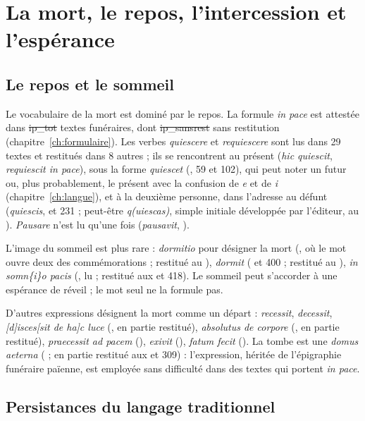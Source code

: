\chapter{La mort, le repos, l’intercession et l’espérance}\label{ch:mort_esperance}

\section{Le repos et le sommeil}

Le vocabulaire de la mort est dominé par le repos. La formule \emph{in pace} est attestée dans \st{ip_tot} textes funéraires, dont \st{ip_sansrest} sans restitution (chapitre~\ref{ch:formulaire}). Les verbes \emph{quiescere} et \emph{requiescere} sont lus dans 29 textes et restitués dans 8 autres ; ils se rencontrent au présent (\emph{hic quiescit}, \emph{requiescit in pace}), sous la forme \emph{quiescet} (, 59 et 102), qui peut noter un futur ou, plus probablement, le présent avec la confusion de \emph{e} et de \emph{i} (chapitre~\ref{ch:langue}), et à la deuxième personne, dans l’adresse au défunt (\emph{quiescis},  et 231 ; peut-être \emph{q(uiescas)}, simple initiale développée par l’éditeur, au ). \emph{Pausare} n’est lu qu’une fois (\emph{pausavit}, ).

L’image du sommeil est plus rare : \emph{dormitio} pour désigner la mort (, où le mot ouvre deux des commémorations ; restitué au ), \emph{dormit} ( et 400 ; restitué au ), \emph{in somn\{i\}o pacis} (, lu ; restitué aux  et 418). Le sommeil peut s’accorder à une espérance de réveil ; le mot seul ne la formule pas.

D’autres expressions désignent la mort comme un départ : \emph{recessit}, \emph{decessit}, \emph{[d]isces[sit de ha]c luce} (, en partie restitué), \emph{absolutus de corpore} (, en partie restitué), \emph{praecessit ad pacem} (), \emph{exivit} (), \emph{fatum fecit} (). La tombe est une \emph{domus aeterna} ( ; en partie restitué aux  et 309) : l’expression, héritée de l’épigraphie funéraire païenne, est employée sans difficulté dans des textes qui portent \emph{in pace}.

\section{Persistances du langage traditionnel}

